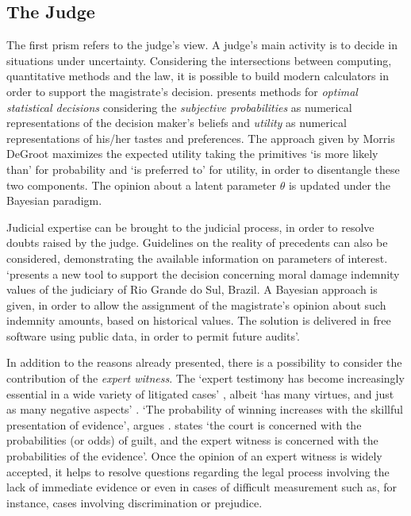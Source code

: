 \documentclass[a4paper]{exam}
\theoremstyle{plain}
\begin{document}
\subsection{The Judge}

The first prism refers to the judge's view. A judge's main activity is to decide in situations under uncertainty. Considering the intersections between computing, quantitative methods and the law, it is possible to build modern calculators in order to support the magistrate's decision. \cite{degroot2004optimal} presents methods for \textit{optimal statistical decisions} considering the \textit{subjective probabilities} as numerical representations of the decision maker's beliefs and \textit{utility} as numerical representations of his/her tastes and preferences. The approach given by Morris DeGroot maximizes the expected utility taking the primitives `is more likely than' for probability and `is preferred to' for utility, in order to disentangle these two components. The opinion about a latent parameter $\theta$ is updated under the Bayesian paradigm.

Judicial expertise can be brought to the judicial process, in order to resolve doubts raised by the judge. Guidelines on the reality of precedents can also be considered, demonstrating the available information on parameters of interest. \cite{zabala2019Bayesian} `presents a new tool to support the decision concerning moral damage indemnity values of the judiciary of Rio Grande do Sul, Brazil. A Bayesian approach is given, in order to allow the assignment of the magistrate’s opinion about such indemnity amounts, based on historical values. The solution is delivered in free software using public data, in order to permit future audits'.

In addition to the reasons already presented, there is a possibility to consider the contribution of the \textit{expert witness}. The `expert testimony has become increasingly essential in a wide variety of litigated cases' \cite{berger2011admissibility}, albeit `has many virtues, and just as many negative aspects' \cite{cohen2015expert}. `The probability of winning increases with the skillful presentation of evidence', argues \cite{matson2012effective}. \cite{aitken1991use} states `the court is concerned with the probabilities (or odds) of guilt, and the expert witness is concerned with the probabilities of the evidence'. Once the opinion of an expert witness is widely accepted, it helps to resolve questions regarding the legal process involving the lack of immediate evidence or even in cases of difficult measurement such as, for instance, cases involving discrimination or prejudice. 
\end{document}
